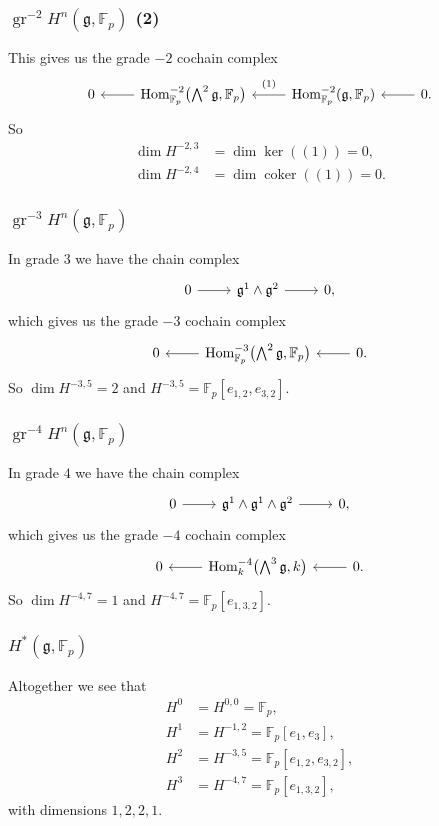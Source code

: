 \documentclass{beamer}
\newcommand*\F{\mathbb{F}}
\DeclareMathOperator{\kernel}{ker} %
\DeclareMathOperator{\coker}{coker}
\DeclareMathOperator{\Hom}{Hom} %
\DeclareMathOperator{\gr}{gr} %
\newcommand*{\lie}[1]{\mathfrak{#1}} %
\begin{document}
\begin{frame}[fragile]
  \frametitle{$\gr^{-2} H^{n}(\lie{g},\F_{p})$ (2)}

  This gives us the grade $-2$ cochain complex
  \[
    \begin{tikzcd}
      0 & \ar[l] \Hom_{\F_{p}}^{-2}\bigl( \bigwedge^{2} \lie{g}, \F_{p} \bigr) & \ar[l, "{(1)}"' {yshift=2pt}] \Hom_{\F_{p}}^{-2}(\lie{g},\F_{p}) & \ar[l] 0.
    \end{tikzcd}
  \]
  So
  \begin{align*}
    \dim H^{-2,3} &= \dim \kernel( (1) ) = 0, \\
    \dim H^{-2,4} &= \dim \coker( (1) ) = 0.
  \end{align*}
\end{frame}

\begin{frame}[fragile]
  \frametitle{$\gr^{-3} H^{n}(\lie{g},\F_{p})$}

  In grade $3$ we have the chain complex
  \[
    \begin{tikzcd}
      0 \ar[r] & \lie{g}^{1} \wedge \lie{g}^{2} \ar[r] & 0,
    \end{tikzcd}
  \]
  which gives us the grade $-3$ cochain complex
  \[
    \begin{tikzcd}
      0 & \ar[l] \Hom_{\F_{p}}^{-3}\bigl( \bigwedge^{2}\lie{g}, \F_{p} \bigr) & \ar[l] 0.
    \end{tikzcd}
  \]
  So $\dim H^{-3,5} = 2$ and $H^{-3,5} = \F_{p}[e_{1,2},e_{3,2}]$.
\end{frame}


\begin{frame}[fragile]
  \frametitle{$\gr^{-4} H^{n}(\lie{g},\F_{p})$}

  In grade $4$ we have the chain complex
  \[
    \begin{tikzcd}
      0 \ar[r] & \lie{g}^{1} \wedge \lie{g}^{1} \wedge \lie{g}^{2}  \ar[r] & 0,
    \end{tikzcd}
  \]
  which gives us the grade $-4$ cochain complex
  \[
    \begin{tikzcd}
      0 & \ar[l] \Hom_{k}^{-4}\bigl( \bigwedge^{3}\lie{g}, k \bigr) & \ar[l] 0.
    \end{tikzcd}
  \]
  So $\dim H^{-4,7} = 1$ and $H^{-4,7} = \F_{p}[e_{1,3,2}]$.
\end{frame}

\begin{frame}
  \frametitle{$H^{*}(\lie{g},\F_{p})$}

  Altogether we see that
  \begin{align*}
    H^{0} &= H^{0,0} = \F_{p}, \\
    H^{1} &= H^{-1,2} = \F_{p}[e_{1},e_{3}], \\
    H^{2} &= H^{-3,5} = \F_{p}[e_{1,2},e_{3,2}], \\
    H^{3} &= H^{-4,7} = \F_{p}[e_{1,3,2}],
  \end{align*}
  with dimensions $1,2,2,1$.
\end{frame}
\end{document}
